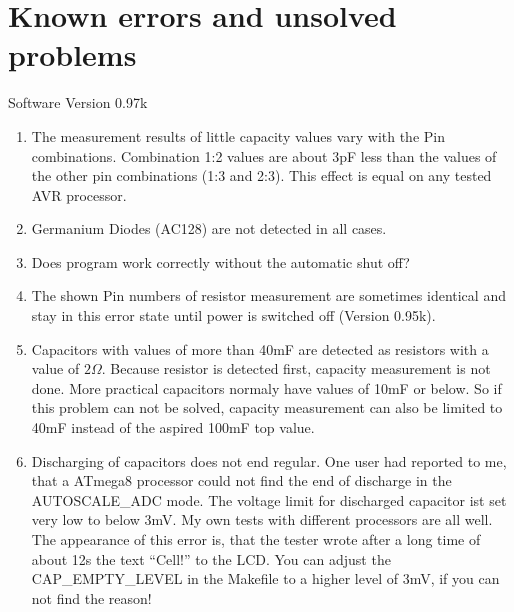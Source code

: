 
\chapter{Known errors and unsolved problems}
{\center Software Version 0.97k}

\begin{enumerate}
\item The measurement results of little capacity values vary with the Pin combinations. Combination 1:2 values are about 3pF less than the values of the other pin combinations  (1:3 and 2:3). This effect is equal on any tested AVR processor.
\item Germanium Diodes (AC128) are not detected in all cases.
\item Does program work correctly without the automatic shut off?
\item The shown Pin numbers of resistor measurement are sometimes identical and stay in this error state until power is switched off
(Version 0.95k).
\item Capacitors with values of more than 40mF are detected as resistors with a value of \(2\Omega\).
Because resistor is detected first, capacity measurement is not done. More practical capacitors normaly have
values of 10mF or below. So if this problem can not be solved, capacity measurement can also be limited to
40mF instead of the aspired 100mF top value.
\item Discharging of capacitors does not end regular. One user had reported to me, that a ATmega8 processor could not
find the end of discharge in the AUTOSCALE\_ADC mode.
The voltage limit for discharged capacitor ist set very low to below 3mV. My own tests with different processors are all well.
The appearance of this error is, that the tester wrote after a long time of about 12s the text ``Cell!'' to the LCD.
You can adjust the CAP\_EMPTY\_LEVEL in the Makefile to a higher level of 3mV, if you can not find the reason!

\end{enumerate}
